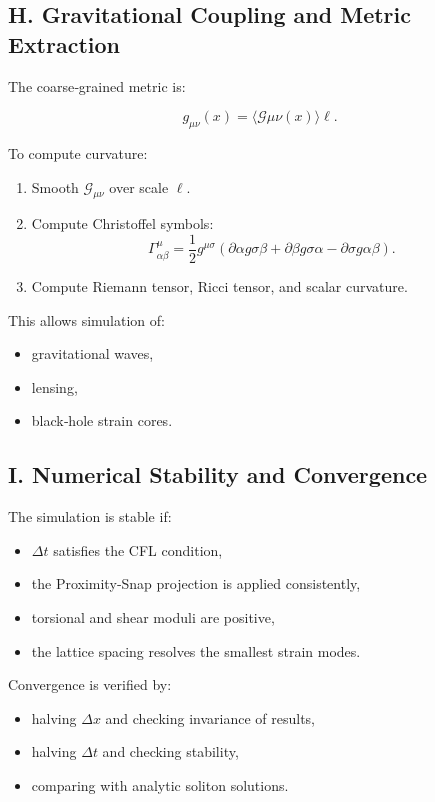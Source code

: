 \documentclass[reprint,amsmath,amssymb,aps,prl,floatfix]{revtex4-2}
\begin{document}
\begin{itemize}
\subsection{H. Gravitational Coupling and Metric Extraction}

The coarse‑grained metric is:

\[
g_{\mu\nu}(x)
=
\langle \mathcal{G}{\mu\nu}(x) \rangle{\ell}.
\]

To compute curvature:

\begin{enumerate}
\item Smooth \(\mathcal{G}_{\mu\nu}\) over scale \(\ell\).  
\item Compute Christoffel symbols:  
   \[
   \Gamma^\mu_{\alpha\beta}
   =
   \frac{1}{2}
   g^{\mu\sigma}
   (\partial\alpha g{\sigma\beta}
   + \partial\beta g{\sigma\alpha}
   - \partial\sigma g{\alpha\beta}).
   \]
\item Compute Riemann tensor, Ricci tensor, and scalar curvature.  
\end{enumerate}

This allows simulation of:
\begin{itemize}
\item gravitational waves,  
\item lensing,  
\item black‑hole strain cores.
\end{itemize}

\subsection{I. Numerical Stability and Convergence}

The simulation is stable if:
\begin{itemize}
\item \(\Delta t\) satisfies the CFL condition,  
\item the Proximity‑Snap projection is applied consistently,  
\item torsional and shear moduli are positive,  
\item the lattice spacing resolves the smallest strain modes.
\end{itemize}

Convergence is verified by:

\begin{itemize}
\item halving \(\Delta x\) and checking invariance of results,  
\item halving \(\Delta t\) and checking stability,  
\item comparing with analytic soliton solutions.
\end{itemize}


\end{itemize}
\end{document}
